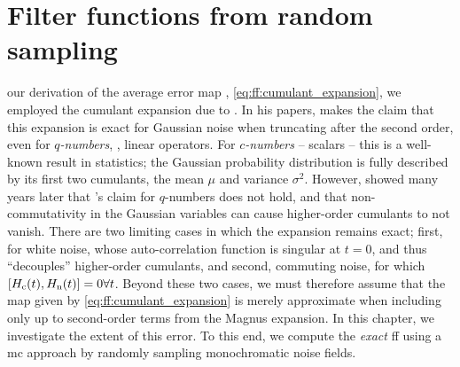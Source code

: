 \chapter{Filter functions from random sampling}\label{ch:ff:validation}
 our derivation of the average error map \liouvUeavg, \cref{eq:ff:cumulant_expansion}, we employed the cumulant expansion due to \citet{Kubo1962,Kubo1963}.
In his papers, \citeauthor{Kubo1962} makes the claim that this expansion is exact for Gaussian noise when truncating after the second order, even for \emph{$q$-numbers}, \ie, linear operators.
For \emph{$c$-numbers} -- scalars -- this is a well-known result in statistics; the Gaussian probability distribution is fully described by its first two cumulants, the mean $\mu$ and variance $\sigma^2$.
However, \citet{Fox1976} showed many years later that \citeauthor{Kubo1962}'s claim for $q$-numbers does not hold, and that non-commutativity in the Gaussian variables can cause higher-order cumulants to not vanish.
There are two limiting cases in which the expansion remains exact; first, for white noise, whose auto-correlation function is singular at $t=0$, and thus \enquote{decouples} higher-order cumulants, and second, commuting noise, for which $\comm{\Hc(t)}{\Hn(t)} = 0\forall t$.
Beyond these two cases, we must therefore assume that the map given by \cref{eq:ff:cumulant_expansion} is merely approximate when including only up to second-order terms from the Magnus expansion.
In this chapter, we investigate the extent of this error.
To this end, we compute the \emph{exact} \acrfull{ff} using a \acrfull{mc} approach by randomly sampling monochromatic noise fields.

